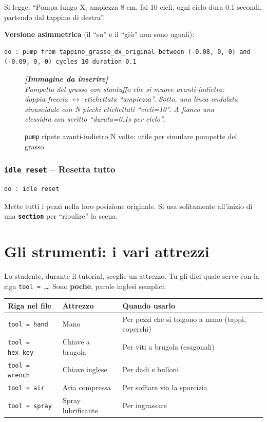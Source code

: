 ﻿\documentclass[a4paper,12pt,oneside]{book}
\newcommand{\kw}[1]{\texttt{\color{keycolor}#1}}
\newcommand{\val}[1]{\texttt{\color{cvtgreen}#1}}
\newcommand{\sez}[1]{\texttt{\color{sectioncolor}\textbf{#1}}}
\newcommand{\imgph}[2]{%
  \begin{tcolorbox}[colback=cvtlightblue!30,colframe=cvtblue!40,%
    width=#1,halign=center,valign=center,height=5cm,boxrule=0.5pt,arc=3pt]%
    \textcolor{cvtgray}{\itshape\footnotesize\textbf{[Immagine da inserire]}\\[3pt]#2}%
  \end{tcolorbox}}
\begin{document}
Si legge: ``Pompa lungo X, ampiezza 8 cm, fai 10 cicli, ogni ciclo dura
0.1 secondi, partendo dal tappino di destra''.

\textbf{Versione asimmetrica} (il ``su'' e il ``giù'' non sono uguali):

\begin{lstlisting}
do : pump from tappino_grasso_dx_original between (-0.08, 0, 0) and (-0.09, 0, 0) cycles 10 duration 0.1
\end{lstlisting}

\begin{figure}[H]
  \centering
  \imgph{11cm}{Pompetta del grasso con stantuffo che si muove avanti-indietro: doppia freccia $\leftrightarrow$ etichettata ``ampiezza''. Sotto, una linea ondulata sinusoidale con N picchi etichettati ``cicli=10''. A fianco una clessidra con scritto ``durata=0.1s per ciclo''.}
  \caption{\val{pump} ripete avanti-indietro N volte: utile per simulare pompette del grasso.}
  \label{fig:pump}
\end{figure}

\subsection{\texttt{idle reset} -- Resetta tutto}

\begin{lstlisting}
do : idle reset
\end{lstlisting}

Mette tutti i pezzi nella loro posizione originale. Si usa solitamente
all'inizio di una \sez{section} per ``ripulire'' la scena.

\chapter{Gli strumenti: i vari attrezzi}
\label{ch:strumenti}

Lo studente, durante il tutorial, sceglie un attrezzo. Tu gli dici quale serve
con la riga \kw{tool = \ldots}. Sono \textbf{poche}, parole inglesi semplici:

\begin{longtable}{@{}llp{8cm}@{}}
\toprule
\textbf{Riga nel file} & \textbf{Attrezzo} & \textbf{Quando usarlo} \\
\midrule
\val{tool = hand}    & Mano                & Per pezzi che si tolgono a mano (tappi, coperchi) \\
\val{tool = hex\_key} & Chiave a brugola    & Per viti a brugola (esagonali) \\
\val{tool = wrench}  & Chiave inglese      & Per dadi e bulloni \\
\val{tool = air}     & Aria compressa      & Per soffiare via la sporcizia \\
\val{tool = spray}   & Spray lubrificante  & Per ingrassare \\
\bottomrule
\end{longtable}
\end{document}
